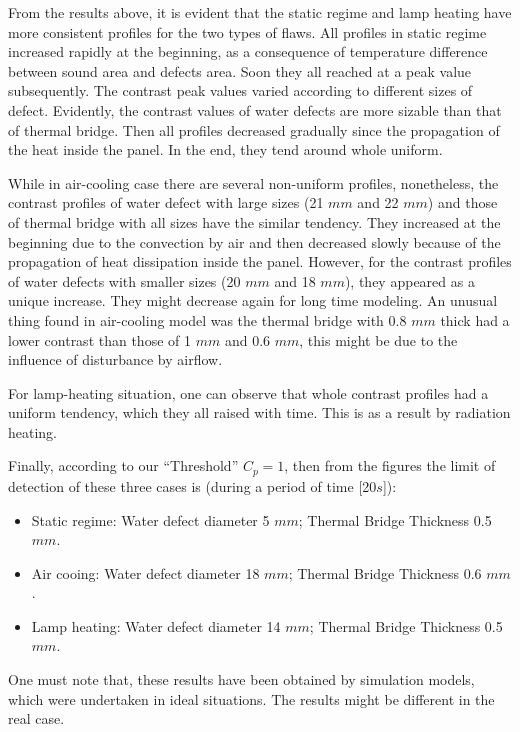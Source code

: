 \documentclass{tQRT2e}
\begin{document}
From the results above, it is evident that the static regime and lamp heating have more consistent profiles for the two types of flaws. All profiles in static regime increased rapidly at the beginning, as a consequence of temperature difference between sound area and defects area. Soon they all reached at a peak value subsequently. The contrast peak values varied according to different sizes of defect. Evidently, the contrast values of water defects are more sizable than that of thermal bridge. Then all profiles decreased gradually since the propagation of the heat inside the panel. In the end, they tend around whole uniform. 

While in air-cooling case there are several non-uniform profiles, nonetheless, the contrast profiles of water defect with large sizes (21 $mm $ and 22 $ mm $) and those of thermal bridge with all sizes have the similar tendency. They increased at the beginning due to the convection by air and then decreased slowly because of the propagation of heat dissipation inside the panel. However, for the contrast profiles of water defects with smaller sizes (20 $ mm $ and 18 $ mm $), they appeared as a unique increase. They might decrease again for long time modeling. An unusual thing found in air-cooling model was the thermal bridge with 0.8 $ mm $ thick had a lower contrast than those of 1 $mm $ and 0.6 $ mm $, this might be due to the influence of disturbance by airflow. 

For lamp-heating situation, one can observe that whole contrast profiles had a uniform tendency, which they all raised with time. This is as a result by radiation heating.

Finally, according to our “Threshold” $ C_p  = 1$, then from the figures the limit of detection of these three cases is (during a period of time [20$ s $]): 
\begin{itemize}
	\item Static regime: Water defect diameter 5 $ mm $; Thermal Bridge Thickness 0.5 $ mm $.
	\item Air cooing: Water defect diameter 18 $ mm $; Thermal Bridge Thickness 0.6 $ mm $.
	\item Lamp heating: Water defect diameter 14 $ mm $; Thermal Bridge Thickness 0.5 $ mm $.
\end{itemize}
One must note that, these results have been obtained by simulation models, which were undertaken in ideal situations. The results might be different in the real case.
\end{document}
